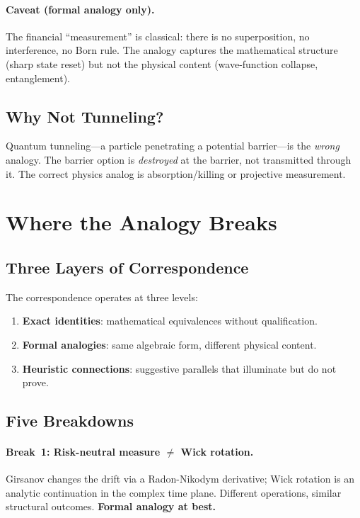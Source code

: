 \paragraph{Caveat (\textbf{formal analogy only}).}
The financial ``measurement'' is classical: there is no superposition, no interference, no Born rule.  The analogy captures the mathematical structure (sharp state reset) but not the physical content (wave-function collapse, entanglement).

\subsection{Why Not Tunneling?}

Quantum tunneling---a particle penetrating a potential barrier---is the \emph{wrong} analogy.  The barrier option is \emph{destroyed} at the barrier, not transmitted through it.  The correct physics analog is absorption/killing or projective measurement.

\section{Where the Analogy Breaks}
\label{sec:breaks}

\subsection{Three Layers of Correspondence}

The correspondence operates at three levels:
\begin{enumerate}
  \item \textbf{Exact identities}: mathematical equivalences without qualification.
  \item \textbf{Formal analogies}: same algebraic form, different physical content.
  \item \textbf{Heuristic connections}: suggestive parallels that illuminate but do not prove.
\end{enumerate}

\subsection{Five Breakdowns}

\paragraph{Break~1: Risk-neutral measure $\neq$ Wick rotation.}
Girsanov changes the drift via a Radon-Nikodym derivative; Wick rotation is an analytic continuation in the complex time plane.  Different operations, similar structural outcomes.  \textbf{Formal analogy at best.}

